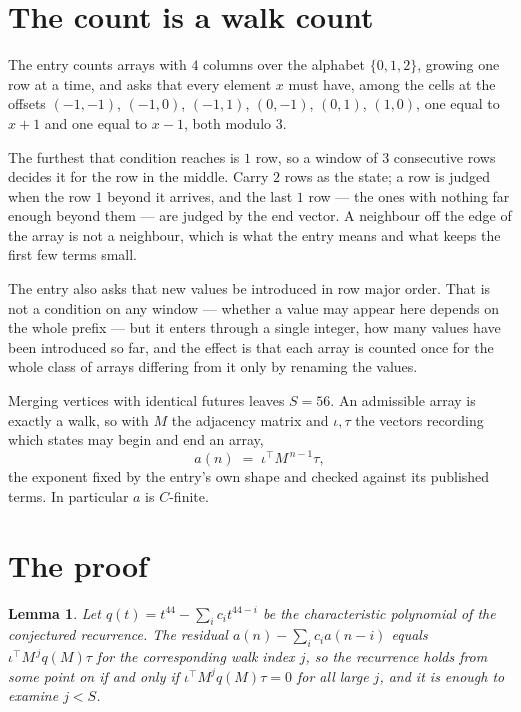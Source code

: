 \documentclass[11pt,a4paper]{article}
\theoremstyle{plain}
\newtheorem{lemma}[theorem]{Lemma}
\theoremstyle{definition}
\begin{document}
\section{The count is a walk count}

The entry counts arrays with $4$ columns over the alphabet $\{0,1,2\}$, growing one row at a time, and asks that every element $x$ must have, among the cells at the offsets $(-1,-1)$, $(-1,0)$, $(-1,1)$, $(0,-1)$, $(0,1)$, $(1,0)$, one equal to $x+1$ and one equal to $x-1$, both modulo $3$.

The furthest that condition reaches is $1$ row, so a window of $3$ consecutive rows decides it for the row in the middle. Carry $2$ rows as the state; a row is judged when the row $1$ beyond it arrives, and the last $1$ row --- the ones with nothing far enough beyond them --- are judged by the end vector. A neighbour off the edge of the array is not a neighbour, which is what the entry means and what keeps the first few terms small.

The entry also asks that new values be introduced in row major order. That is not a condition on any window --- whether a value may appear here depends on the whole prefix --- but it enters through a single integer, how many values have been introduced so far, and the effect is that each array is counted once for the whole class of arrays differing from it only by renaming the values.

Merging vertices with identical futures leaves $S=56$. An admissible array is exactly a walk, so with $M$ the adjacency matrix and $\iota,\tau$ the vectors recording which states may begin and end an array,
\[
a(n)\;=\;\iota^{\!\top}M^{\,n-1}\tau ,
\]
the exponent fixed by the entry's own shape and checked against its published terms. In
particular $a$ is $C$-finite.

\section{The proof}

\begin{lemma}\label{lem:crit}
Let $q(t)=t^{44}-\sum_i c_it^{44-i}$ be the characteristic polynomial of the
conjectured recurrence. The residual $a(n)-\sum_ic_ia(n-i)$ equals
$\iota^{\!\top}M^{\,j}q(M)\tau$ for the corresponding walk index $j$, so the recurrence
holds from some point on if and only if $\iota^{\!\top}M^{j}q(M)\tau=0$ for all large $j$,
and it is enough to examine $j<S$.
\end{lemma}
\end{document}
